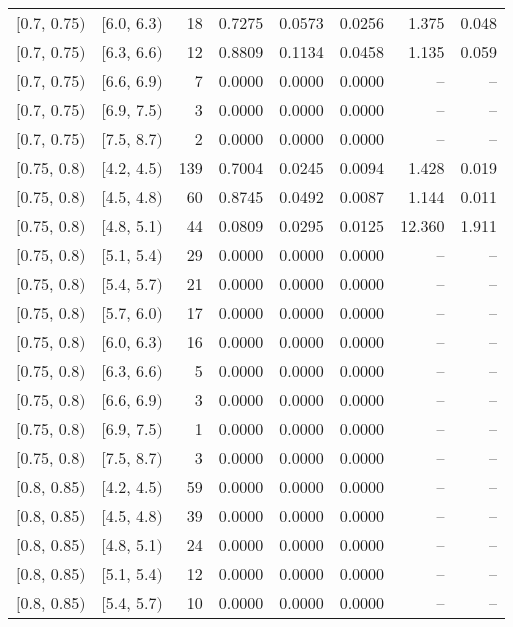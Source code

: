 \begin{longtable}{| l | l | r | r | r | r | r | r |}
        $[$0.7, 0.75$)$ & $[$6.0, 6.3$)$ & 18 & 0.7275 & 0.0573 & 0.0256 & 1.375 & 0.048 \\
        $[$0.7, 0.75$)$ & $[$6.3, 6.6$)$ & 12 & 0.8809 & 0.1134 & 0.0458 & 1.135 & 0.059 \\
        $[$0.7, 0.75$)$ & $[$6.6, 6.9$)$ & 7 & 0.0000 & 0.0000 & 0.0000 & -- & -- \\
        $[$0.7, 0.75$)$ & $[$6.9, 7.5$)$ & 3 & 0.0000 & 0.0000 & 0.0000 & -- & -- \\
        $[$0.7, 0.75$)$ & $[$7.5, 8.7$)$ & 2 & 0.0000 & 0.0000 & 0.0000 & -- & -- \\
        $[$0.75, 0.8$)$ & $[$4.2, 4.5$)$ & 139 & 0.7004 & 0.0245 & 0.0094 & 1.428 & 0.019 \\
        $[$0.75, 0.8$)$ & $[$4.5, 4.8$)$ & 60 & 0.8745 & 0.0492 & 0.0087 & 1.144 & 0.011 \\
        $[$0.75, 0.8$)$ & $[$4.8, 5.1$)$ & 44 & 0.0809 & 0.0295 & 0.0125 & 12.360 & 1.911 \\
        $[$0.75, 0.8$)$ & $[$5.1, 5.4$)$ & 29 & 0.0000 & 0.0000 & 0.0000 & -- & -- \\
        $[$0.75, 0.8$)$ & $[$5.4, 5.7$)$ & 21 & 0.0000 & 0.0000 & 0.0000 & -- & -- \\
        $[$0.75, 0.8$)$ & $[$5.7, 6.0$)$ & 17 & 0.0000 & 0.0000 & 0.0000 & -- & -- \\
        $[$0.75, 0.8$)$ & $[$6.0, 6.3$)$ & 16 & 0.0000 & 0.0000 & 0.0000 & -- & -- \\
        $[$0.75, 0.8$)$ & $[$6.3, 6.6$)$ & 5 & 0.0000 & 0.0000 & 0.0000 & -- & -- \\
        $[$0.75, 0.8$)$ & $[$6.6, 6.9$)$ & 3 & 0.0000 & 0.0000 & 0.0000 & -- & -- \\
        $[$0.75, 0.8$)$ & $[$6.9, 7.5$)$ & 1 & 0.0000 & 0.0000 & 0.0000 & -- & -- \\
        $[$0.75, 0.8$)$ & $[$7.5, 8.7$)$ & 3 & 0.0000 & 0.0000 & 0.0000 & -- & -- \\
        $[$0.8, 0.85$)$ & $[$4.2, 4.5$)$ & 59 & 0.0000 & 0.0000 & 0.0000 & -- & -- \\
        $[$0.8, 0.85$)$ & $[$4.5, 4.8$)$ & 39 & 0.0000 & 0.0000 & 0.0000 & -- & -- \\
        $[$0.8, 0.85$)$ & $[$4.8, 5.1$)$ & 24 & 0.0000 & 0.0000 & 0.0000 & -- & -- \\
        $[$0.8, 0.85$)$ & $[$5.1, 5.4$)$ & 12 & 0.0000 & 0.0000 & 0.0000 & -- & -- \\
        $[$0.8, 0.85$)$ & $[$5.4, 5.7$)$ & 10 & 0.0000 & 0.0000 & 0.0000 & -- & -- \\

\end{longtable}
